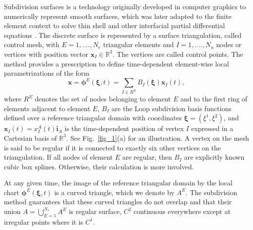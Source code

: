 Subdivision surfaces is a technology originally developed in computer graphics to numerically represent smooth surfaces, which was later adapted to the finite element context to solve thin shell and other interfacial partial differential equations  \cite{loop1987,stam1998,cirak2000,cirak2011,torres2019}. The discrete surface is represented by a surface triangulation, called control mesh, with $E= 1,....,N_e$ triangular elements and $I= 1,....,N_n$ nodes or vertices with position vector $\bm{x}_I\in\mathbb{R}^3$. The vertices are called control points. The method provides a prescription to define time-dependent element-wise local parametrizations of the form
\begin{equation} \label{9_17}
    \bm{x}= \bm{\phi}^E(\bm{\xi},t)= \underset{I \in R^E}{\mathrm{\sum}} B_I(\bm{\xi})\bm{x}_I(t),
\end{equation} 
where $R^E$ denotes the set of nodes belonging to element $E$ and to the first ring of elements adjacent to element $E$,  $B_I$ are the Loop subdivision basis functions defined over a reference triangular domain with coordinates $\bm{\xi} = (\xi^1, \xi^2)$, and $\bm{x}_I(t) = x^A_I(t) \bm{i}_A$ is the time-dependent position of vertex $I$ expressed in a Cartesian basis of $\mathbb{R}^3$. See Fig.~\ref{fig_1}(a) for an illustration. A vertex on the mesh is said to be regular if it is connected to exactly six other vertices on the triangulation. If all nodes of element $E$ are regular, then $B_I$ are explicitly known cubic box splines. Otherwise, their calculation is more involved.   

At any given time, the image of the reference triangular domain by the local chart $\bm{\phi}^E(\bm{\xi},t)$ is a curved triangle, which we denote by $A^E$. The subdivision method guarantees that these curved triangles do not overlap and that their union  $A = \bigcup_{E=1}^{N_e} A^E$ is regular surface, $C^2$ continuous everywhere except at irregular points where it is $C^1$.


